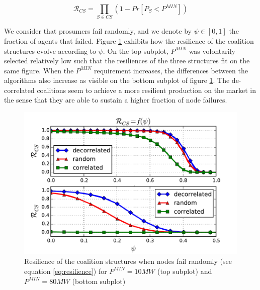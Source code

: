\documentclass[conference]{IEEEtran}
\begin{document}
\begin{equation}
\mathcal{R}_{CS} = \prod_{S \in CS} \left( 1 - Pr[ P_{S} < P^{MIN} ] \right)
\label{eq:resilience}
\end{equation}

We consider that prosumers fail randomly, and we denote by $ \psi \in [0,1] $ the fraction of agents that failed. Figure \ref{fig:resilience} exhibits how the resilience of the coalition structures evolve according to $ \psi $. On the top subplot, $ P^{MIN} $ was volontarily selected relatively low such that the resiliences of the three structures fit on the same figure. When the $ P^{MIN} $ requirement increases, the differences between the algorithms also increase as visible on the bottom subplot of figure \ref{fig:resilience}. The de-correlated coalitions seem to achieve a more resilient production on the market in the sense that they are able to sustain a higher fraction of node failures.

\begin{figure}
\includegraphics[scale=.6]{./figures/resilience_both.pdf}
\caption{Resilience of the coalition structures when nodes fail randomly (see equation \ref{eq:resilience}) for $ P^{MIN} = 10MW $ (top subplot) and $ P^{MIN} = 80MW $ (bottom subplot) }
\label{fig:resilience}
\end{figure}



\end{document}
